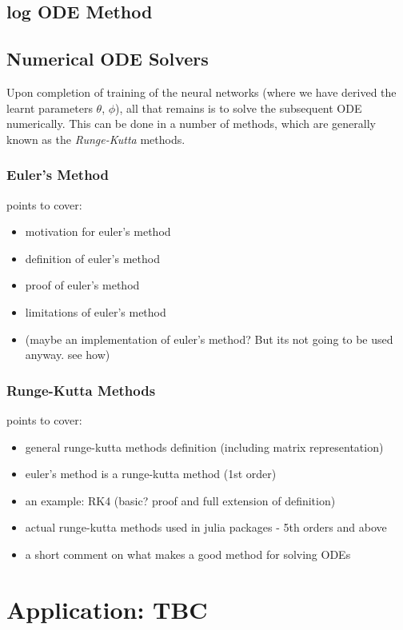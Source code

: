 \documentclass[a4paper,11pt, titlepage]{article}
\theoremstyle{definition}
\theoremstyle{plain}
\theoremstyle{remark}
\begin{document}
\subsection{log ODE Method}

\subsection{Numerical ODE Solvers}
Upon completion of training of the neural networks (where we have derived the learnt parameters $\theta$, $\phi$), all that remains is to solve the subsequent ODE numerically. This can be done in a number of methods, which are generally known as the \textit{Runge-Kutta} methods.

\subsubsection{Euler's Method}
points to cover:
\begin{itemize}
    \item motivation for euler's method
    \item definition of euler's method
    \item proof of euler's method
    \item limitations of euler's method
    \item (maybe an implementation of euler's method? But its not going to be used anyway. see how)
\end{itemize}

\subsubsection{Runge-Kutta Methods}
points to cover:
\begin{itemize}
    \item general runge-kutta methods definition (including matrix representation)
    \item euler's method is a runge-kutta method (1st order)
    \item an example: RK4 (basic? proof and full extension of definition)
    \item actual runge-kutta methods used in julia packages - 5th orders and above  
    \item a short comment on what makes a good method for solving ODEs
\end{itemize}

\section{Application: TBC}
\end{document}
